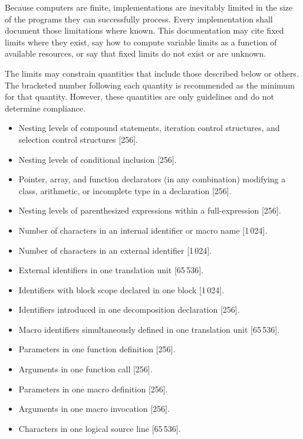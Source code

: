 
\begin{paras}

\pnum
Because computers are finite, \Cpp  implementations are inevitably
limited in the size of the programs they can successfully process.
Every implementation shall
document those limitations where known.
This documentation may cite fixed limits where they
exist, say how to compute variable limits as a function
of available resources, or say that fixed limits do not exist
or are unknown.

\pnum
The limits may constrain quantities
that include those described below or others.
The bracketed number following each quantity is recommended
as the minimum for that quantity.
However, these quantities are only guidelines and do not determine compliance.
\begin{itemize}
\item%
Nesting levels of compound statements,
iteration control structures,
and selection control structures [256].
\item%
Nesting levels of conditional inclusion [256].
\item%
Pointer, array, and function declarators
(in any combination)
modifying a class, arithmetic,
or incomplete type in a declaration [256].
\item%
Nesting levels of parenthesized expressions within a full-expression [256].
\item%
Number of
characters in an internal identifier
or macro name [1\,024].
\item%
Number of
characters in an external identifier [1\,024].
\item%
External identifiers in one translation unit [65\,536].
\item%
Identifiers with block scope declared in one block [1\,024].
\item%
Identifiers introduced in one decomposition declaration [256].
\item%
Macro identifiers simultaneously defined in one
translation
unit [65\,536].
\item%
Parameters in one function definition [256].
\item%
Arguments in one function call [256].
\item%
Parameters in one macro definition [256].
\item%
Arguments in one macro invocation [256].
\item%
Characters in one logical source line [65\,536].

\end{itemize}
\end{paras}
